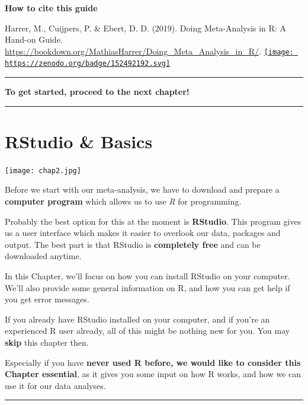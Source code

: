 \documentclass[]{book}
\begin{document}
\textbf{How to cite this guide}

Harrer, M., Cuijpers, P. \& Ebert, D. D. (2019). Doing Meta-Analysis in R: A Hand-on Guide. \url{https://bookdown.org/MathiasHarrer/Doing_Meta_Analysis_in_R/}.
\href{https://zenodo.org/badge/latestdoi/152492192}{\texttt{[image: https://zenodo.org/badge/152492192.svg]}}

\begin{center}\rule{0.5\linewidth}{\linethickness}\end{center}

\textbf{To get started, proceed to the next chapter!}

\begin{center}\rule{0.5\linewidth}{\linethickness}\end{center}

\hypertarget{rstudio-basics}{%
\chapter{RStudio \& Basics}\label{rstudio-basics}}

\texttt{[image: chap2.jpg]}

\begin{rmdinfo}
Before we start with our meta-analysis, we have to download and prepare
a \textbf{computer program} which allows us to use \emph{R} for
programming.

Probably the best option for this at the moment is \textbf{RStudio}.
This program gives us a user interface which makes it easier to overlook
our data, packages and output. The best part is that RStudio is
\textbf{completely free} and can be downloaded anytime.

In this Chapter, we'll focus on how you can install RStudio on your
computer. We'll also provide some general information on R, and how you
can get help if you get error messages.

If you already have RStudio installed on your computer, and if you're an
experienced R user already, all of this might be nothing new for you.
You may \textbf{skip} this chapter then.

Especially if you have \textbf{never used R before, we would like to
consider this Chapter essential}, as it gives you some input on how R
works, and how we can use it for our data analyses.
\end{rmdinfo}

\begin{center}\rule{0.5\linewidth}{\linethickness}\end{center}
\end{document}

